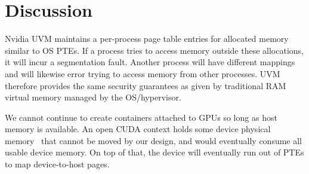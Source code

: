 \section{Discussion}

\begin{comment}
\noindent \textbf{Why not Nvidia MIG or MPS?}
Previous work has used MPS to enable time slicing of GPUs~\cite{gu2023fast}, but using MPS has a number of drawbacks that make it poorly suited to serverless.
MPS is explicitly designed to let cooperative processes share GPU resources, and documentation specifies that it is intended to work with OpenMP/MPI applications.
If any process encounters a critical error, \emph{all} processes connected to the MPS server will crash, meaning one faulty serverless function will break all containers using the GPU, regardless of the function it is for.
The amount of GPU memory and compute usable by a process can be specified at process launch time, and is fixed thereafter.
If one wishes to adjust allocations, a new container must be spun up with the large overhead that entails.
Importantly, support for MPS features varies one hardware, and only the newest devices fully support these resource management features.
MPS does not enable oversubscribing limited device memory, and the inability to truly isolate processes from one another makes it a poor candidate for FaaS.

Nvidia MIG has similar drawbacks to MPS with poor resource management capabilities.
Once slice(s) of the GPU are assigned to a container/VM, the only way to adjust them is to launch a new container.
Multiple containers could share and timeslice GPU partitions, but this is just a more complicated version of timeslicing the entire GPU via userspace management.
The partitions sizes are fixed as manufacturing time, and lead to resource fragmentation and underutilization.
Memory oversubscription and temporal sharing of compute as we have described in this work are a more ideal way of utilizing GPU compute in a serverless platform.

\end{comment}

Nvidia UVM maintains a per-process page table entries for allocated memory similar to OS PTEs.
If a process tries to access memory outside these allocations, it will incur a segmentation fault.
Another process will have different mappings and will likewise error trying to access memory from other processes.
UVM therefore provides the same security guarantees as given by traditional RAM virtual memory managed by the OS/hypervisor.

We cannot continue to create containers attached to GPUs so long as host memory is available. %
An open CUDA context holds some device physical memory~\cite{cuda-ctx-overhead} that cannot be moved by our design, and would eventually consume all usable device memory.
On top of that, the device will eventually run out of PTEs to map device-to-host pages.
